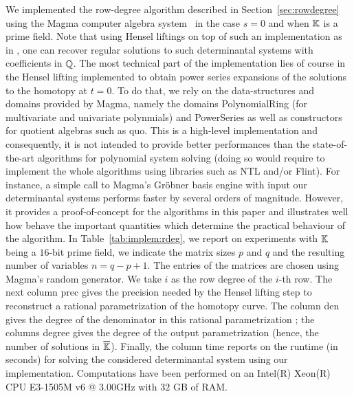 \documentclass[amsthm]{elsart}
\begin{document}
We implemented the row-degree algorithm described in Section~\ref{sec:rowdegree}
using the {\sf Magma} computer algebra system~\cite{Magma} in the case $s = 0$
and when $\mathbb{K}$ is a prime field. Note that using Hensel liftings on top of such
an implementation as in \cite{GiLeSa01}, one can recover regular solutions to
such determinantal systems with coefficients in $\mathbb{Q}$. The most technical part of
the implementation lies of course in the Hensel lifting implemented to obtain
power series expansions of the solutions to the homotopy at $t = 0$. To do that,
we rely on the data-structures and domains provided by {\sf Magma}, namely the
domains {\sf PolynomialRing} (for multivariate and univariate polynmials) and
{\sf PowerSeries} as well as constructors for quotient algebras such as {\sf
  quo}. This is a high-level implementation and consequently, it is not intended
to provide better performances than the state-of-the-art algorithms for
polynomial system solving (doing so would require to implement the whole
algorithms using libraries such as {\sf NTL} and/or {\sf Flint}). For instance,
a simple call to {\sf Magma}'s Gr\"obner basis engine with input our
determinantal systems performs faster by several orders of magnitude. However,
it provides a proof-of-concept for the algorithms in this paper and illustrates
well how behave the important quantities which determine the practical behaviour
of the algorithm. In Table~\ref{tab:implem:rdeg}, we report on experiments with
$\mathbb{K}$ being a $16$-bit prime field, we indicate the matrix sizes $p$ and $q$ and
the resulting number of variables $n = q - p + 1$. The entries of the matrices
are chosen using {\sf Magma}'s random generator. We take $i$ as the row degree
of the $i$-th row. The next column {\sf prec} gives the precision needed by the
Hensel lifting step to reconstruct a rational parametrization of the homotopy
curve. The column {\sf den} gives the degree of the denominator in this
rational parametrization ; the columns {\sf degree} gives the degree of the
output parametrization (hence, the number of solutions in $\overline{\mathbb{K}}$). Finally,
the column {\sf time} reports on the runtime (in seconds) for solving the considered
determinantal system using our implementation. Computations have been performed
on an Intel(R) Xeon(R) CPU E3-1505M v6 @ 3.00GHz with $32$ GB of RAM.
\end{document}
